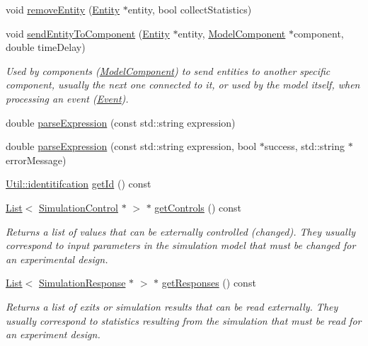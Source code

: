 \begin{DoxyCompactItemize}
void \hyperlink{class_model_ae62bb3a21cd56fbf9d34195edf2fb9e0}{remove\+Entity} (\hyperlink{class_entity}{Entity} $\ast$entity, bool collect\+Statistics)
\item 
void \hyperlink{class_model_a244dff6d6bef962b0d95fbe712954079}{send\+Entity\+To\+Component} (\hyperlink{class_entity}{Entity} $\ast$entity, \hyperlink{class_model_component}{Model\+Component} $\ast$component, double time\+Delay)
\begin{DoxyCompactList}\small\item\em Used by components (\hyperlink{class_model_component}{Model\+Component}) to send entities to another specific component, usually the next one connected to it, or used by the model itself, when processing an event (\hyperlink{class_event}{Event}). \end{DoxyCompactList}\item 
double \hyperlink{class_model_a5ea283e339b50c0b77040bf908e25af3}{parse\+Expression} (const std\+::string expression)
\item 
double \hyperlink{class_model_a408ddfa761fcd04ec1211ae6c1526ab3}{parse\+Expression} (const std\+::string expression, bool $\ast$success, std\+::string $\ast$error\+Message)
\item 
\hyperlink{class_util_ad17d458d9344b10bba64347e514d6d71}{Util\+::identitifcation} \hyperlink{class_model_abfd7753d30de6abea64b3f0846e097eb}{get\+Id} () const 
\item 
\hyperlink{class_list}{List}$<$ \hyperlink{class_simulation_control}{Simulation\+Control} $\ast$ $>$ $\ast$ \hyperlink{class_model_a20c078a714fe7fba0f02ea1d50a19589}{get\+Controls} () const 
\begin{DoxyCompactList}\small\item\em Returns a list of values that can be externally controlled (changed). They usually correspond to input parameters in the simulation model that must be changed for an experimental design. \end{DoxyCompactList}\item 
\hyperlink{class_list}{List}$<$ \hyperlink{class_simulation_response}{Simulation\+Response} $\ast$ $>$ $\ast$ \hyperlink{class_model_ad4caeecd30fd5eb67b46c232cfbea14b}{get\+Responses} () const 
\begin{DoxyCompactList}\small\item\em Returns a list of exits or simulation results that can be read externally. They usually correspond to statistics resulting from the simulation that must be read for an experiment design. \end{DoxyCompactList}\item 

\end{DoxyCompactItemize}
